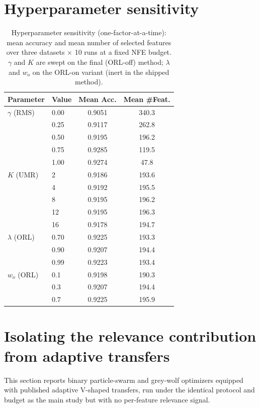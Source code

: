 \documentclass[9pt]{article}
\begin{document}
\section{Hyperparameter sensitivity}
\begin{table}[t]
\centering
\caption{Hyperparameter sensitivity (one-factor-at-a-time): mean accuracy and mean number of selected features over three datasets $\times$ 10 runs at a fixed NFE budget. $\gamma$ and $K$ are swept on the final (ORL-off) method; $\lambda$ and $w_o$ on the ORL-on variant (inert in the shipped method).}
\label{tab:sensitivity}
\footnotesize
\begin{tabular}{llcc}
\toprule
Parameter & Value & Mean Acc. & Mean \#Feat. \\
\midrule
$\gamma$ (RMS) & 0.00 & 0.9051 & 340.3 \\
 & 0.25 & 0.9117 & 262.8 \\
 & 0.50 & 0.9195 & 196.2 \\
 & 0.75 & 0.9285 & 119.5 \\
 & 1.00 & 0.9274 & 47.8 \\
\addlinespace
$K$ (UMR) & 2 & 0.9186 & 193.6 \\
 & 4 & 0.9192 & 195.5 \\
 & 8 & 0.9195 & 196.2 \\
 & 12 & 0.9195 & 196.3 \\
 & 16 & 0.9178 & 194.7 \\
\addlinespace
$\lambda$ (ORL) & 0.70 & 0.9225 & 193.3 \\
 & 0.90 & 0.9207 & 194.4 \\
 & 0.99 & 0.9223 & 193.4 \\
\addlinespace
$w_o$ (ORL) & 0.1 & 0.9198 & 190.3 \\
 & 0.3 & 0.9207 & 194.4 \\
 & 0.7 & 0.9225 & 195.9 \\
\bottomrule
\end{tabular}
\end{table}


\FloatBarrier
\section{Isolating the relevance contribution from adaptive transfers}
This section reports binary particle-swarm and grey-wolf optimizers
equipped with published adaptive V-shaped transfers, run under the identical
protocol and budget as the main study but with no per-feature relevance
signal.
\end{document}
